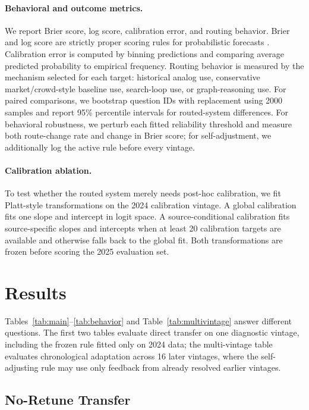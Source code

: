 \documentclass{article}
\begin{document}
\paragraph{Behavioral and outcome metrics.} We report Brier score, log score, calibration error, and routing behavior. Brier and log score are strictly proper scoring rules for probabilistic forecasts \citep{gneiting2007strictly}. Calibration error is computed by binning predictions and comparing average predicted probability to empirical frequency. Routing behavior is measured by the mechanism selected for each target: historical analog use, conservative market/crowd-style baseline use, search-loop use, or graph-reasoning use. For paired comparisons, we bootstrap question IDs with replacement using 2000 samples and report 95\% percentile intervals for routed-system differences. For behavioral robustness, we perturb each fitted reliability threshold and measure both route-change rate and change in Brier score; for self-adjustment, we additionally log the active rule before every vintage.

\paragraph{Calibration ablation.} To test whether the routed system merely needs post-hoc calibration, we fit Platt-style transformations on the 2024 calibration vintage. A global calibration fits one slope and intercept in logit space. A source-conditional calibration fits source-specific slopes and intercepts when at least 20 calibration targets are available and otherwise falls back to the global fit. Both transformations are frozen before scoring the 2025 evaluation set.

\section{Results}
\label{sec:results}

Tables~\ref{tab:main}--\ref{tab:behavior} and Table~\ref{tab:multivintage} answer different questions. The first two tables evaluate direct transfer on one diagnostic vintage, including the frozen rule fitted only on 2024 data; the multi-vintage table evaluates chronological adaptation across 16 later vintages, where the self-adjusting rule may use only feedback from already resolved earlier vintages.

\subsection{No-Retune Transfer}
\end{document}

